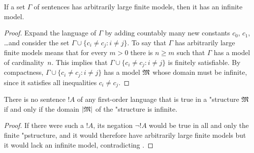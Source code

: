 \documentclass[../../include/open-logic-section]{subfiles}
\begin{document}

\begin{thm}
  If a set $\Gamma$ of sentences has arbitrarily large finite models,
  then it has an infinite model.
\end{thm}

\begin{proof}
  Expand the language of $\Gamma$ by adding countably many new
  constants $c_0$, $c_1$, \dots and consider the set $\Gamma \cup
  \{c_i \neq c_j : i \neq j\}$. To say that $\Gamma$ has arbitrarily
  large finite models means that for every $m >0$ there is $n\ge m$
  such that $\Gamma$ has a model of cardinality~$n$. This implies that
  $\Gamma \cup \{c_i \neq c_j : i \neq j\}$ is finitely
  satisfiable. By compactness, $\Gamma \cup \{c_i \neq c_j : i \neq
  j\}$ has a model $\mathfrak M$ whose domain must be infinite, since it
  satisfies all inequalities $c_i \neq c_j$.
\end{proof}

\begin{prop}
  There is no sentence $!A$ of any first-order language
  that is true in a "{structure} $\mathfrak M$ if and only
  if the domain $\left| \mathfrak M \right|$ of the "{structure} is infinite.
\end{prop}

\begin{proof}
  If there were such a $!A$, its negation $\lnot !A$ would
  be true in all and only the finite "p{structure}, and it would
  therefore have arbitrarily large finite models but it would lack an
  infinite model, contradicting .
\end{proof}
\end{document}
